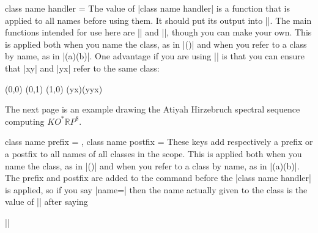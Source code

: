 \begin{sseqdata}[name = basic, cohomological Serre grading]
\begin{key}{class name handler = }
%
The value of |class name handler| is a function that is applied to all names
before using them. It should put its output into |\result|. The main functions
intended for use here are |\SseqAHSSNameHandler| and |\SseqNormalizeMonomial|,
though you can make your own. This is applied both when you name the class, as
in \codeverb|\class[name=a]()| and when you refer to a class by
name, as in |\structline(a)(b)|. One advantage if you are using
|\SseqNormalizeMonomial| is that you can ensure that |xy| and |yx| refer to the
same class:
\begin{codeexample}[]
\begin{sseqpage}[ class name handler = \SseqNormalizeMonomial,
                  classes = {show name = {right,pin}} ]
\class[name = xy](0,0)
\class[name = yxy](0,1)
\class(1,0)
\structline(yx)(yyx)
\end{sseqpage}
\end{codeexample}
The next page is an example drawing the Atiyah Hirzebruch spectral sequence
computing $KO^*\mathbb{R}P^{8}$.
\end{key}

\begin{keylist}{class name prefix = , class name postfix = }%
These keys add respectively a prefix or a postfix to all names of all classes in
the scope. This is applied both when you name the class, as in
\codeverb|\class[name=a]()| and when you refer to a class by
name, as in |\structline(a)(b)|. The prefix and postfix are added to the command
before the |class name handler| is applied, so if you say |name=|
then the name actually given to the class is the value of |\result| after saying
\begin{center}
||
\end{center}
\end{keylist}


\end{sseqdata}

